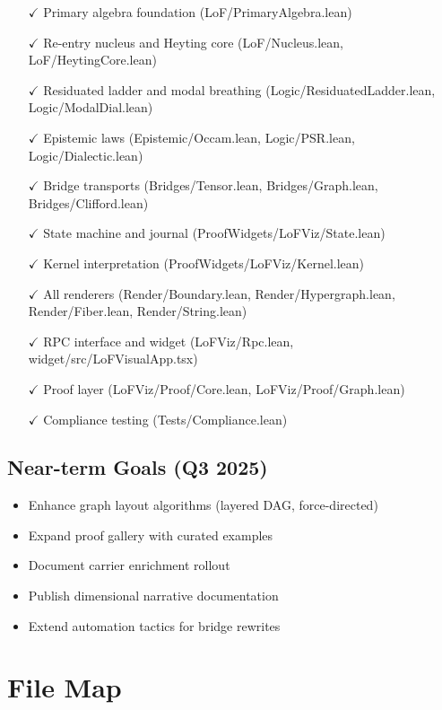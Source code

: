 \documentclass{amsart}
\theoremstyle{definition}
\theoremstyle{remark}
\begin{document}
\begin{itemize}
\item[$\checkmark$] Primary algebra foundation (LoF/PrimaryAlgebra.lean)
\item[$\checkmark$] Re-entry nucleus and Heyting core (LoF/Nucleus.lean, LoF/HeytingCore.lean)
\item[$\checkmark$] Residuated ladder and modal breathing (Logic/ResiduatedLadder.lean, Logic/ModalDial.lean)
\item[$\checkmark$] Epistemic laws (Epistemic/Occam.lean, Logic/PSR.lean, Logic/Dialectic.lean)
\item[$\checkmark$] Bridge transports (Bridges/Tensor.lean, Bridges/Graph.lean, Bridges/Clifford.lean)
\item[$\checkmark$] State machine and journal (ProofWidgets/LoFViz/State.lean)
\item[$\checkmark$] Kernel interpretation (ProofWidgets/LoFViz/Kernel.lean)
\item[$\checkmark$] All renderers (Render/Boundary.lean, Render/Hypergraph.lean, Render/Fiber.lean, Render/String.lean)
\item[$\checkmark$] RPC interface and widget (LoFViz/Rpc.lean, widget/src/LoFVisualApp.tsx)
\item[$\checkmark$] Proof layer (LoFViz/Proof/Core.lean, LoFViz/Proof/Graph.lean)
\item[$\checkmark$] Compliance testing (Tests/Compliance.lean)
\end{itemize}

\subsection{Near-term Goals (Q3 2025)}

\begin{itemize}
\item Enhance graph layout algorithms (layered DAG, force-directed)
\item Expand proof gallery with curated examples
\item Document carrier enrichment rollout
\item Publish dimensional narrative documentation
\item Extend automation tactics for bridge rewrites
\end{itemize}

\section{File Map}
\end{document}
